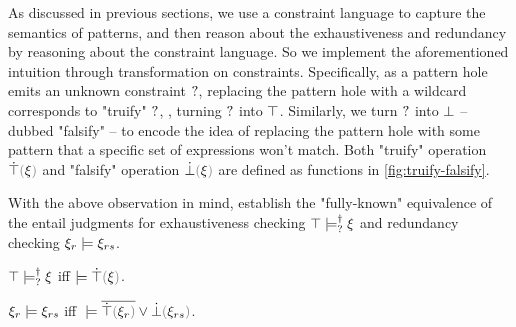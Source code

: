 As discussed in previous sections, we use a constraint language to capture the semantics of patterns, and then reason about the exhaustiveness and redundancy by reasoning about the constraint language. So we implement the aforementioned intuition through transformation on constraints. Specifically, as a pattern hole emits an unknown constraint $\mathtt{?}$, replacing the pattern hole with a wildcard corresponds to "truify" $\mathtt{?}$, \ie, turning $\mathtt{?}$ into $\top$. Similarly, we turn $\mathtt{?}$ into $\bot$ -- dubbed "falsify" -- to encode the idea of replacing the pattern hole with some pattern that a specific set of expressions won't match. Both "truify" operation $\ctruify{\xi}$ and "falsify" operation $\cfalsify{\xi}$ are defined as functions in \autoref{fig:truify-falsify}. 




With the above observation in mind,  establish the "fully-known" equivalence of the entail judgments for exhaustiveness checking $\top \models_{?}^{\dag} \xi$ and redundancy checking $\xi_r \models \xi_{rs}$.

\begin{theorem}
\label{theorem:exhaustive-truify}
  $\top \models_{?}^{\dag} \xi$ iff $\ccsatisfy{}{\ctruify{\xi}}$.
\end{theorem}

\begin{theorem}
\label{theorem:redundant-truify-falsify}
  $\xi_r \models \xi_{rs}$ iff $\ccsatisfy{\;}{\cor{\cdual{\ctruify{\xi_r}}}{\cfalsify{\xi_{rs}}}}$.
\end{theorem}



